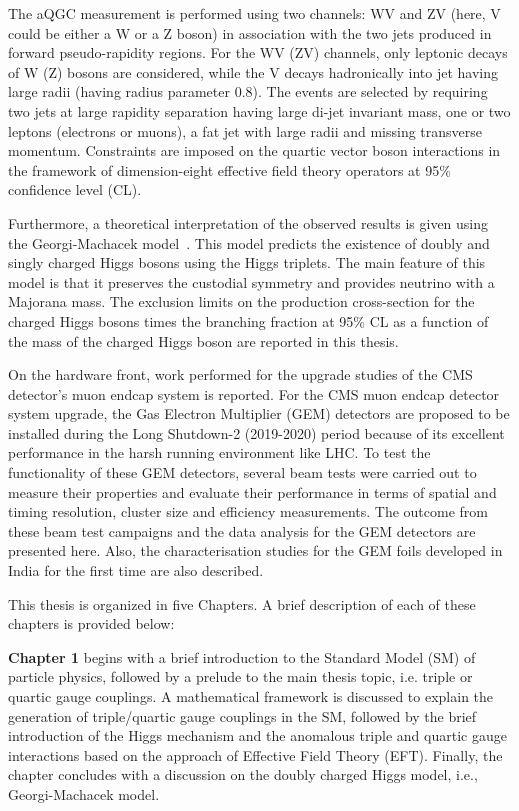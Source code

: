 The aQGC measurement is performed using two channels: WV and ZV (here, V could be either a W or a Z boson) in association with the two jets produced in forward pseudo-rapidity regions. For the WV (ZV) channels, only leptonic decays of W (Z) bosons are considered, while the V decays hadronically into jet having large radii (having radius parameter 0.8). The events are selected by requiring two jets at large rapidity separation having large di-jet invariant mass, one or two leptons (electrons or muons), a fat jet with large radii and missing transverse momentum. Constraints are imposed on the quartic vector boson interactions in the framework of dimension-eight effective field theory operators at 95\% confidence level (CL).

Furthermore, a theoretical interpretation of the observed results is given using the Georgi-Machacek model~\cite{GEORGI1985463}. This model predicts the existence of doubly and singly charged Higgs bosons using the Higgs triplets. The main feature of this model is that it preserves the custodial symmetry and provides neutrino with a Majorana mass. The exclusion limits on the production cross-section for the charged Higgs bosons times the branching fraction at 95\% CL as a function of the mass of the charged Higgs boson are reported in this thesis.

On the hardware front, work performed for the upgrade studies of the CMS detector's muon endcap system is reported. For the CMS muon endcap detector system upgrade, the Gas Electron Multiplier (GEM) detectors are proposed to be installed during the Long Shutdown-2 (2019-2020) period because of its excellent performance in the harsh running environment like LHC. To test the functionality of these GEM detectors, several beam tests were carried out to measure their properties and evaluate their performance in terms of spatial and timing resolution, cluster size and efficiency measurements. The outcome from these beam test campaigns and the data analysis for the GEM detectors are presented here. Also, the characterisation studies for the GEM foils developed in India for the first time are also described.

This thesis is organized in five Chapters. A brief description of each of these chapters is provided below:

\textbf{Chapter 1} begins with a brief introduction to the Standard Model (SM) of particle physics, followed by a prelude to the main thesis topic, i.e. triple or quartic gauge couplings. A mathematical framework is discussed to explain the generation of triple/quartic gauge couplings in the SM, followed by the brief introduction of the Higgs mechanism and the anomalous triple and quartic gauge interactions based on the approach of Effective Field Theory (EFT). Finally, the chapter concludes with a discussion on the doubly charged Higgs model, i.e., Georgi-Machacek model.

